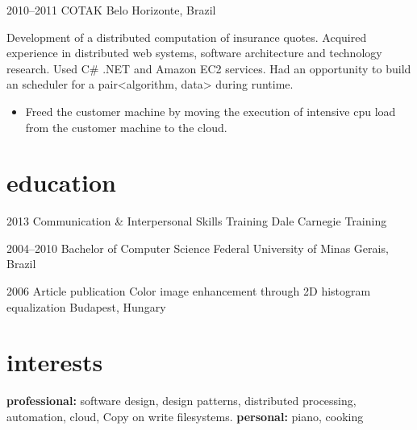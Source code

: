 \documentclass[]{friggeri-cv-a4}
\begin{document}
\begin{entrylist}
\entry
{2010--2011}
{COTAK}
{Belo Horizonte, Brazil}
{ Development of a distributed computation of insurance quotes. Acquired experience in  distributed web systems, software architecture and technology research. 
Used C\# .NET and Amazon EC2 services. Had an opportunity to build an scheduler for a pair<algorithm, data> during runtime.
\begin{itemize}
    \item Freed the customer machine by moving the execution of intensive cpu load from the customer machine to the cloud.
\end{itemize}
}


\end{entrylist}

\section{education}

\begin{entrylist}

\entry
{2013}
{Communication \& Interpersonal {\normalfont Skills Training}}
{Dale Carnegie Training}

\entry
{2004--2010}
{{\normalfont Bachelor of} Computer Science}
{Federal University of Minas Gerais, Brazil}

\entry
{2006}
{Article publication {\normalfont Color image enhancement through 2D histogram equalization}}
{Budapest, Hungary}

\end{entrylist}


\section{interests}

\textbf{professional:} software design, design patterns, distributed processing, automation, cloud, Copy on write filesystems. \textbf{personal:} piano, cooking
\end{document}
